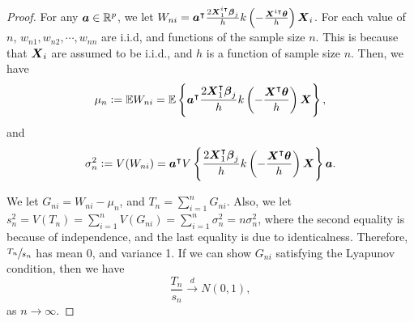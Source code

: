 \begin{proof}
	For any  $\boldsymbol{a} \in \mathbb{R}^p$, we let $W_{ni}=\boldsymbol{a^{\intercal}}\frac{2\boldsymbol{X}_{1}^{i\intercal}\boldsymbol{\beta}_j}{h}k\left(-\frac{\boldsymbol{X}^{i\intercal}\boldsymbol{\theta}}{h}\right)\boldsymbol{X}_{i}$. For each value of $n$, $w_{n1},w_{n2},\cdots,w_{nn}$ are i.i.d, and functions of the sample size $n$. This is because that $\boldsymbol{X}_{i}$ are assumed to be i.i.d., and $h$ is a function of sample
	size $n$. Then, we have
	\begin{gather*}
	\mu_{n}:=\mathbb{E}W_{ni}=\mathbb{E}\left\{\boldsymbol{a^{\intercal}}\frac{2\boldsymbol{X}_{1}^{\intercal}\boldsymbol{\beta}_j}{h}k\left(-\frac{\boldsymbol{X}^{\intercal}\boldsymbol{\theta}}{h}\right)\boldsymbol{X}\right\},
	\end{gather*}
	and 
	\begin{gather*}
	\sigma_{n}^{2}:=V(W_{ni})=\boldsymbol{\boldsymbol{a}^{\intercal}}V\left\{\frac{2\boldsymbol{X}_{1}^{\intercal}\boldsymbol{\beta}_j}{h}k\left(-\frac{\boldsymbol{X}^{\intercal}\boldsymbol{\theta}}{h}\right)\boldsymbol{X}\right\}\boldsymbol{a}.
	\end{gather*}
	
	We let $G_{ni}=W_{ni}-\mu_{\ensuremath{n}}$, and $T_{n}=\sum_{i=1}^{n}G_{ni}$. Also, we let $s_{n}^{2}=V(T_{n})=\sum_{i=1}^{n}V(G_{ni})=\sum_{i=1}^{n}\sigma_{n}^{2}=n\sigma_{n}^{2}$, where the second equality is because of independence, and the last equality is due to identicalness. Therefore, $\sfrac{T_{n}}{s_{n}}$ has mean 0, and variance 1.  If we can show $G_{ni}$ satisfying the Lyapunov condition, then
	we have
	\[
	\frac{T_{n}}{s_{n}}\overset{d}{\to}N(0,1),
	\]
	as $n \to \infty$.
	

\end{proof}
